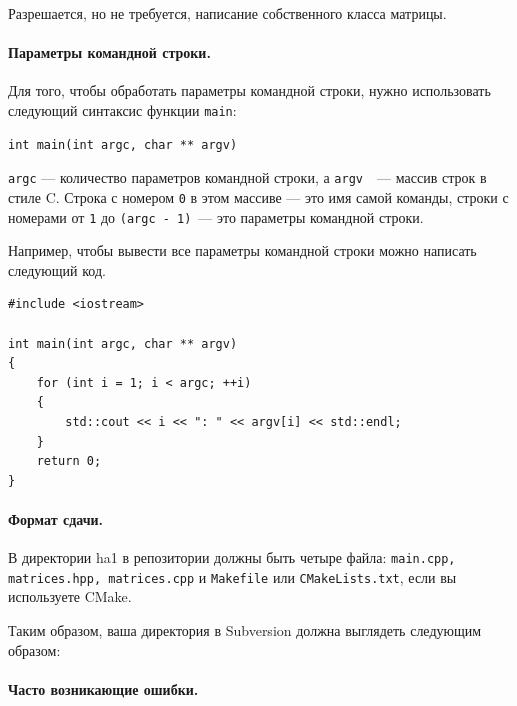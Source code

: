 \documentclass[a4paper,10pt]{article}
\begin{document}
Разрешается, но не требуется, написание собственного класса матрицы.

\paragraph{Параметры командной строки.}
Для того, чтобы обработать параметры командной строки, нужно использовать следующий синтаксис функции {\tt main}:
\begin{lstlisting}
int main(int argc, char ** argv)
\end{lstlisting}
{\tt argc} — количество параметров командной строки,
а  {\tt argv }~— массив строк в стиле C. Строка с номером
{\tt 0} в этом массиве — это имя самой команды,
строки с номерами от {\tt 1} до {\tt (argc - 1)}~—
это параметры командной строки.

Например, чтобы вывести все параметры командной строки
можно написать следующий код.
\begin{lstlisting}
#include <iostream>

int main(int argc, char ** argv)
{
    for (int i = 1; i < argc; ++i)
    {
        std::cout << i << ": " << argv[i] << std::endl;
    }
    return 0;
}
\end{lstlisting}

\paragraph{Формат сдачи.}
В директории ha1 в репозитории должны быть четыре файла:
{\tt main.cpp, matrices.hpp, matrices.cpp} и {\tt Makefile}
или {\tt CMakeLists.txt}, если вы используете CMake.

Таким образом, ваша директория в Subversion должна выглядеть следующим образом:

\paragraph{Часто возникающие ошибки.}
\end{document}
